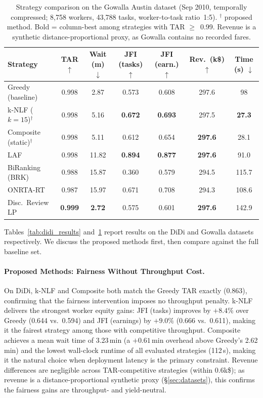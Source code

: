 \begin{table}[t]
\scriptsize
\renewcommand\arraystretch{1}
\setlength\tabcolsep{2pt}
\caption{Strategy comparison on the Gowalla Austin dataset
  (Sep 2010, temporally compressed; 8,758 workers, 43,788 tasks, worker-to-task ratio~1:5).
  $^\dagger$ proposed method. Bold = column-best among strategies with TAR $\geq$~0.99.
  Revenue is a synthetic distance-proportional proxy, as Gowalla contains no recorded fares.}
\label{tab:gowalla_results}
\begin{tabular}{@{}l cccc c c@{}}
\toprule
\textbf{Strategy}
  & \textbf{TAR} $\uparrow$
  & \textbf{Wait (m)} $\downarrow$
  & \textbf{JFI (tasks)} $\uparrow$
  & \textbf{JFI (earn.)} $\uparrow$
  & \textbf{Rev.\ (k\$)} $\uparrow$
  & \textbf{Time (s)} $\downarrow$ \\
\midrule
Greedy (baseline)
  & 0.998 & 2.87 & 0.573 & 0.608 & 297.6 & 98 \\
k-NLF ($k{=}15$)$^\dagger$
  & 0.998 & 5.16 & \textbf{0.672} & \textbf{0.693} & 297.5 & \textbf{27.3} \\
Composite (static)$^\dagger$
  & 0.998 & 5.11 & 0.612 & 0.654 & \textbf{297.6} & 28.1 \\
\midrule
LAF
  & 0.998 & 11.82 & \textbf{0.894} & \textbf{0.877} & \textbf{297.6} & 91.0 \\
BiRanking (BRK)
  & 0.988 & 15.87 & 0.360 & 0.579 & 294.5 & 115.7 \\
ONRTA-RT
  & 0.987 & 15.97 & 0.671 & 0.708 & 294.3 & 108.6 \\
Disc.\ Review LP
  & \textbf{0.999} & \textbf{2.72} & 0.575 & 0.601 & \textbf{297.6} & 142.9 \\
\bottomrule
\end{tabular}
\end{table}

Tables~\ref{tab:didi_results} and~\ref{tab:gowalla_results} report results on the
DiDi and Gowalla datasets respectively. We discuss the proposed methods first,
then compare against the full baseline set.

\paragraph{Proposed Methods: Fairness Without Throughput Cost.}
On DiDi, k-NLF and Composite both match the Greedy TAR exactly (0.863), confirming
that the fairness intervention imposes no throughput penalty. k-NLF delivers the
strongest worker equity gains: JFI (tasks) improves by $+8.4\%$ over Greedy
(0.644 vs.\ 0.594) and JFI (earnings) by $+9.0\%$ (0.666 vs.\ 0.611), making
it the fairest strategy among those with competitive throughput. Composite achieves
a mean wait time of 3.23\,min (a $+0.61$\,min overhead above Greedy's 2.62\,min)
and the lowest wall-clock runtime of all evaluated strategies (112\,s), making it
the natural choice when deployment latency is the primary constraint. Revenue
differences are negligible across TAR-competitive strategies (within 0.6k\$); as
revenue is a distance-proportional synthetic proxy (§\ref{sec:datasets}), this
confirms the fairness gains are throughput- and yield-neutral.


